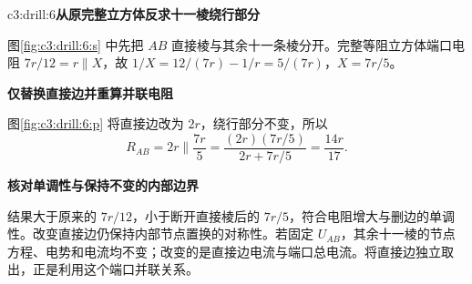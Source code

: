 \begin{drillsolution}{c3:drill:6}\textbf{从原完整立方体反求十一棱绕行部分}\par\nobreak
图\ref{fig:c3:drill:6:s} 中先把 $AB$ 直接棱与其余十一条棱分开。完整等阻立方体端口电阻 $7r/12=r\parallel X$，故 $1/X=12/(7r)-1/r=5/(7r)$，$X=7r/5$。



\par\medskip{}\noindent\textbf{仅替换直接边并重算并联电阻}\par\nobreak
图\ref{fig:c3:drill:6:p} 将直接边改为 $2r$，绕行部分不变，所以
\[
 R_{AB}=2r\parallel\frac{7r}{5}
 =\frac{(2r)(7r/5)}{2r+7r/5}=\frac{14r}{17}.
\]


\par\medskip{}\noindent\textbf{核对单调性与保持不变的内部边界}\par\nobreak
结果大于原来的 $7r/12$，小于断开直接棱后的 $7r/5$，符合电阻增大与删边的单调性。改变直接边仍保持内部节点置换的对称性。若固定 $U_{AB}$，其余十一棱的节点方程、电势和电流均不变；改变的是直接边电流与端口总电流。将直接边独立取出，正是利用这个端口并联关系。\end{drillsolution}

